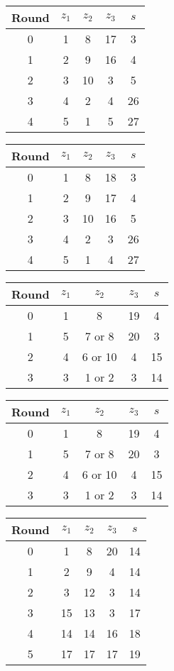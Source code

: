 \begin{multicols}{2}
\begin{tabular}{c | c | c | c | c }
Round & $z_1$ & $z_2$ & $z_3$ & $s$ \\
\hline
0 & 1 & 8 & 17 & 3 \\
1 & 2 & 9 & 16 & 4 \\
2 & 3 & 10 & 3 & 5 \\
3 & 4 & 2 & 4 & 26 \\
4 & 5 & 1 & 5 & 27
\end{tabular}


\begin{tabular}{c | c | c | c | c }
Round & $z_1$ & $z_2$ & $z_3$ & $s$ \\
\hline
0 & 1 & 8 & 18 & 3 \\
1 & 2 & 9 & 17 & 4 \\
2 & 3 & 10 & 16 & 5 \\
3 & 4 & 2 & 3 & 26 \\
4 & 5 & 1 & 4 & 27
\end{tabular}


\begin{tabular}{c | c | c | c | c }
Round & $z_1$ & $z_2$ & $z_3$ & $s$ \\
\hline
0 & 1 & 8 & 19 & 4 \\
1 & 5 & 7 or 8 & 20 & 3 \\
2 & 4 & 6 or 10 & 4 & 15 \\
3 & 3 & 1 or 2 & 3 & 14
\end{tabular}


\begin{tabular}{c | c | c | c | c }
Round & $z_1$ & $z_2$ & $z_3$ & $s$ \\
\hline
0 & 1 & 8 & 19 & 4 \\
1 & 5 & 7 or 8 & 20 & 3 \\
2 & 4 & 6 or 10 & 4 & 15 \\
3 & 3 & 1 or 2 & 3 & 14
\end{tabular}


\begin{tabular}{c | c | c | c | c }
Round & $z_1$ & $z_2$ & $z_3$ & $s$ \\
\hline
0 & 1 & 8 & 20 & 14 \\
1 & 2 & 9 & 4 & 14 \\
2 & 3 & 12 & 3 & 14 \\
3 & 15 & 13 & 3 & 17 \\
4 & 14 & 14 & 16 & 18 \\
5 & 17 & 17 & 17 & 19
\end{tabular}



\end{multicols}
